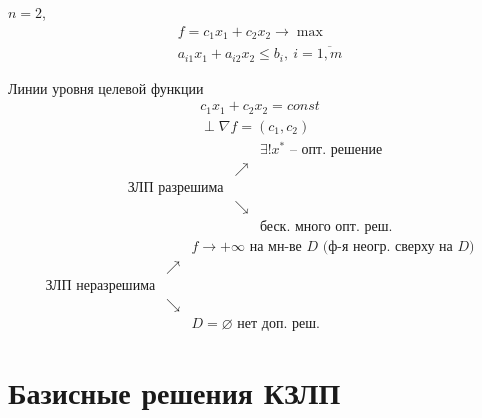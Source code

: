 \begin{note}
	$n=2$,
	\[
		\begin{array}{l}
			f = c_1x_1 + c_2x_2 \rightarrow \max \\
			a_{i1} x_1 + a_{i2} x_2 \leqslant b_i, \ i = \overline{1,m}
		\end{array}
	\]

	\begin{figure}[H]
		\centering
		\label{fig:fig-1}
	\end{figure}

	Линии уровня целевой функции
	\[
		\begin{array}{l}
			c_1x_1 + c_2x_2 = const \\
			\perp \nabla f = (c_1,c_2)
		\end{array}
	\]
	\[
		\begin{array}{ccl}
			                     &          & \exists ! x^* \text{ -- опт. решение} \\
			                     & \nearrow &                                       \\
			\text{ЗЛП разрешима} &          &                                       \\
			                     & \searrow &                                       \\
			                     &          & \text{беск. много опт. реш.}
		\end{array}
	\]
	\[
		\begin{array}{ccl}
			                       &          & f \rightarrow +\infty \text{ на мн-ве }D \text{ (ф-я неогр. сверху на }D \text{)} \\
			                       & \nearrow &                                                                                   \\
			\text{ЗЛП неразрешима} &          &                                                                                   \\
			                       & \searrow &                                                                                   \\
			                       &          & D = \varnothing \text{ нет доп. реш.}
		\end{array}
	\]
\end{note}

\section{Базисные решения КЗЛП}


